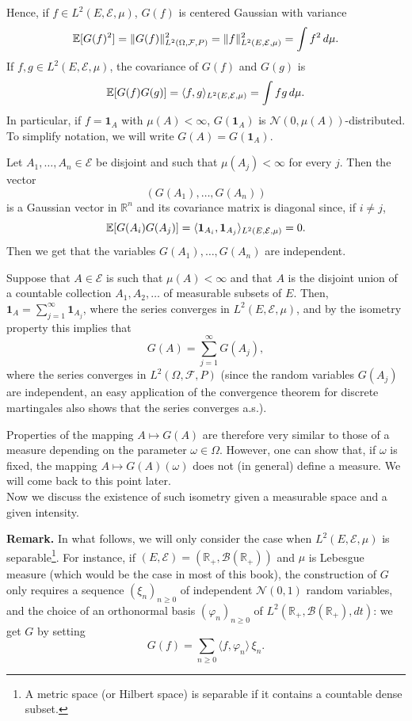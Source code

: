 \documentclass[../Main.tex]{subfiles}
\begin{document}
Hence, if $f\in L^2(E,\mathcal E,\mu)$, $G(f)$ is centered Gaussian with variance
\[ \mathbb{E}[G(f)^2] = \|G(f)\|^2_{L^2(\Omega,\mathcal F,P)} = \|f\|^2_{L^2(E,\mathcal E,\mu)} = \int f^2\,d\mu. \]
If $f,g\in L^2(E,\mathcal E,\mu)$, the covariance of $G(f)$ and $G(g)$ is
\[ \mathbb{E}[G(f)G(g)] = \langle f,g\rangle_{L^2(E,\mathcal E,\mu)} = \int fg\,d\mu. \]
In particular, if $f=\mathbf{1}_A$ with $\mu(A)<\infty$, $G(\mathbf{1}_A)$ is $\mathcal N(0,\mu(A))$-distributed. To simplify notation, we will write $G(A)=G(\mathbf{1}_A)$.

Let $A_1,\dots,A_n\in\mathcal E$ be disjoint and such that $\mu(A_j)<\infty$ for every $j$. Then the vector
\[ (G(A_1),\dots,G(A_n)) \]
is a Gaussian vector in $\mathbb R^n$ and its covariance matrix is diagonal since, if $i\neq j$,
\[ \mathbb{E}[G(A_i)G(A_j)] = \langle \mathbf{1}_{A_i}, \mathbf{1}_{A_j}\rangle_{L^2(E,\mathcal E,\mu)} = 0. \]
Then we get that the variables $G(A_1),\dots,G(A_n)$ are independent.

Suppose that $A\in\mathcal E$ is such that $\mu(A)<\infty$ and that $A$ is the disjoint union of a countable collection $A_1,A_2,\dots$ of measurable subsets of $E$. Then, $\mathbf{1}_A = \sum_{j=1}^\infty \mathbf{1}_{A_j}$, where the series converges in $L^2(E,\mathcal E,\mu)$, and by the isometry property this implies that
\[ G(A) = \sum_{j=1}^\infty G(A_j), \]
where the series converges in $L^2(\Omega,\mathcal F,P)$ (since the random variables $G(A_j)$ are independent, an easy application of the convergence theorem for discrete martingales also shows that the series converges a.s.).

Properties of the mapping $A\mapsto G(A)$ are therefore very similar to those of a measure depending on the parameter $\omega\in\Omega$. However, one can show that, if $\omega$ is fixed, the mapping $A\mapsto G(A)(\omega)$ does not (in general) define a measure. We will come back to this point later.\\
Now we discuss the existence of such isometry given a measurable space and a given intensity. 

\noindent\textbf{Remark.} In what follows, we will only consider the case when $L^2(E,\mathcal E,\mu)$ is separable\footnote{A metric space (or Hilbert space) is separable if it contains a countable dense subset.}. For instance, if $(E,\mathcal E) = (\mathbb R_+,\mathcal B(\mathbb R_+))$ and $\mu$ is Lebesgue measure (which would be the case in most of this book), the construction of $G$ only requires a sequence $(\xi_n)_{n\geq 0}$ of independent $\mathcal N(0,1)$ random variables, and the choice of an orthonormal basis $(\varphi_n)_{n\geq 0}$ of $L^2(\mathbb R_+,\mathcal B(\mathbb R_+),dt)$: we get $G$ by setting
\[ G(f) = \sum_{n\geq 0} \langle f,\varphi_n\rangle\,\xi_n. \]
\end{document}
